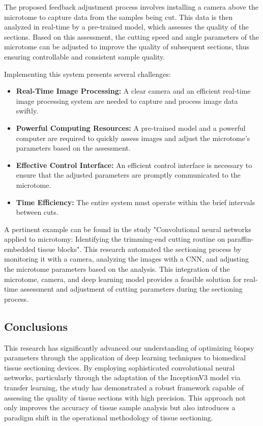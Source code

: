 The proposed feedback adjustment process involves installing a camera above the microtome to capture data from the samples being cut. This data is then analyzed in real-time by a pre-trained model, which assesses the quality of the sections. Based on this assessment, the cutting speed and angle parameters of the microtome can be adjusted to improve the quality of subsequent sections, thus ensuring controllable and consistent sample quality.

Implementing this system presents several challenges:

\begin{itemize}
    \item \textbf{Real-Time Image Processing:} A clear camera and an efficient real-time image processing system are needed to capture and process image data swiftly.
    \item \textbf{Powerful Computing Resources:} A pre-trained model and a powerful computer are required to quickly assess images and adjust the microtome's parameters based on the assessment.
    \item \textbf{Effective Control Interface:} An efficient control interface is necessary to ensure that the adjusted parameters are promptly communicated to the microtome.
    \item \textbf{Time Efficiency:} The entire system must operate within the brief intervals between cuts.
\end{itemize}

A pertinent example can be found in the study "Convolutional neural networks applied to microtomy: Identifying the trimming-end cutting routine on paraffin-embedded tissue blocks"\cite{6.4}. This research automated the sectioning process by monitoring it with a camera, analyzing the images with a CNN, and adjusting the microtome parameters based on the analysis. This integration of the microtome, camera, and deep learning model provides a feasible solution for real-time assessment and adjustment of cutting parameters during the sectioning process.


\subsection{Conclusions}

This research has significantly advanced our understanding of optimizing biopsy parameters through the application of deep learning techniques to biomedical tissue sectioning devices. By employing sophisticated convolutional neural networks, particularly through the adaptation of the InceptionV3 model via transfer learning, the study has demonstrated a robust framework capable of assessing the quality of tissue sections with high precision. This approach not only improves the accuracy of tissue sample analysis but also introduces a paradigm shift in the operational methodology of tissue sectioning.

